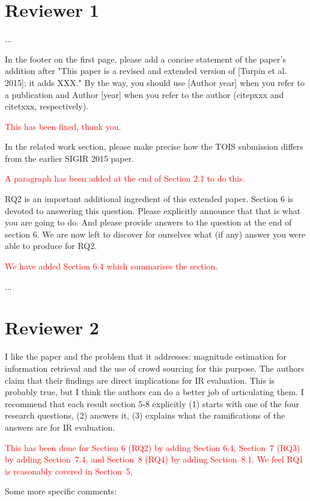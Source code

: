 \documentclass{article}
\newcommand{\comment}[1]{\vspace{1em} \textcolor{red}{{#1}} \vspace{1em}}
\begin{document}
\section{Reviewer 1}

...

In the footer on the first page, please add a concise statement of
the paper's addition after "This paper is a revised and extended
version of [Turpin et al. 2015]; it adds XXX." By the way, you
should use [Author year] when you refer to a publication and Author
[year] when you refer to the author (citep{xxx} and citet{xxx},
respectively).

\comment{This has been fixed, thank you.}

In the related work section, please make precise how the TOIS
submission differs from the earlier SIGIR 2015 paper.

\comment{A paragraph has been added at the end of Section 2.1 to do this.}

RQ2 is an important additional ingredient of this extended paper.
Section 6 is devoted to answering this question. Please explicitly
announce that that is what you are going to do. And please provide
answers to the question at the end of section 6. We are now left
to discover for ourselves what (if any) answer you were able to
produce for RQ2.

\comment{We have added Section 6.4 which summarises the section.}

\noindent ...


\section{Reviewer 2}

I like the paper and the problem that it addresses: magnitude
estimation for information retrieval and the use of crowd sourcing
for this purpose. The authors claim that their findings are direct
implications for IR evaluation. This is probably true, but I think
the authors can do a better job of articulating them. I recommend
that each result section 5-8 explicitly (1) starts with one of the
four research questions, (2) answers it, (3) explains what the
ramifications of the answers are for IR evaluation.

\comment{
This has been done for Section 6 (RQ2) by adding Section 6.4, 
Section~7 (RQ3) by adding Section~7.4, and
Section~8 (RQ4) by adding Section~8.1.
We feel RQ1 is reasonably covered in Section~5.
}

Some more specific comments:
\end{document}
